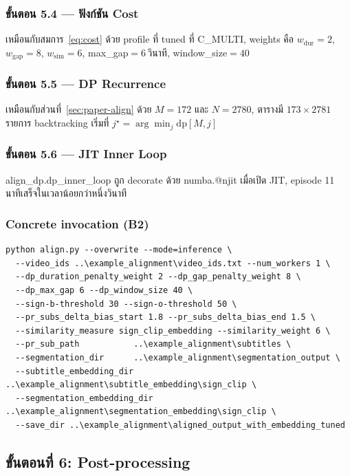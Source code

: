 \documentclass[11pt,a4paper]{article}
\def\texttt#1{#1}%
\begin{document}
\subsubsection{ขั้นตอน 5.4 --- ฟังก์ชัน Cost}
\label{sec:cost}
เหมือนกับสมการ~\eqref{eq:cost} ด้วย profile ที่ tuned ที่ \texttt{C\_MULTI},
weights คือ $w_{\mathrm{dur}}{=}2$, $w_{\mathrm{gap}}{=}8$,
$w_{\mathrm{sim}}{=}6$, \texttt{max\_gap}${=}6$\,วินาที,
\texttt{window\_size}${=}40$

\subsubsection{ขั้นตอน 5.5 --- DP Recurrence}
เหมือนกับส่วนที่~\ref{sec:paper-align} ด้วย $M=172$ และ $N=2780$,
ตารางมี $173 \times 2781$ รายการ backtracking เริ่มที่
$j^\star = \arg\min_j \mathrm{dp}[M, j]$

\subsubsection{ขั้นตอน 5.6 --- JIT Inner Loop}
\texttt{align\_dp.dp\_inner\_loop} ถูก decorate ด้วย \texttt{numba.@njit}
เมื่อเปิด JIT, episode 11 นาทีเสร็จในเวลาน้อยกว่าหนึ่งวินาที

\subsubsection{Concrete invocation (B2)}
\begin{lstlisting}
python align.py --overwrite --mode=inference \
  --video_ids ..\example_alignment\video_ids.txt --num_workers 1 \
  --dp_duration_penalty_weight 2 --dp_gap_penalty_weight 8 \
  --dp_max_gap 6 --dp_window_size 40 \
  --sign-b-threshold 30 --sign-o-threshold 50 \
  --pr_subs_delta_bias_start 1.8 --pr_subs_delta_bias_end 1.5 \
  --similarity_measure sign_clip_embedding --similarity_weight 6 \
  --pr_sub_path           ..\example_alignment\subtitles \
  --segmentation_dir      ..\example_alignment\segmentation_output \
  --subtitle_embedding_dir     ..\example_alignment\subtitle_embedding\sign_clip \
  --segmentation_embedding_dir ..\example_alignment\segmentation_embedding\sign_clip \
  --save_dir ..\example_alignment\aligned_output_with_embedding_tuned
\end{lstlisting}


\subsection{ขั้นตอนที่ 6: Post-processing}
\label{sec:post}
\end{document}
